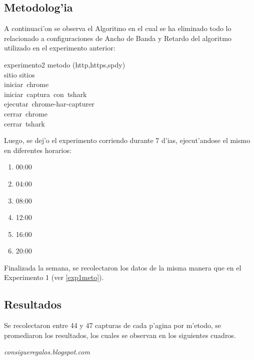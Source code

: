 \documentclass[a4paper,11pt,twocolumn]{article}
\begin{document}
\subsection{Metodolog'ia}

A continuaci'on se observa el Algoritmo en el cual se ha eliminado todo lo relacionado a configuraciones de Ancho de Banda y Retardo del algoritmo utilizado en el experimento anterior:

\begin{pseudocode}{experimento2}{ }
\FOR metodo \in (http,https,spdy) \DO \\
\BEGIN
	\FOR sitio \in sitios \DO \\
	\BEGIN
		iniciar\ chrome\\
		iniciar\ captura\ con\ tshark\\
		ejecutar\ chrome-har-capturer\\
		cerrar\ chrome\\
		cerrar\ tshark
	\END
\END
\end{pseudocode}

Luego, se dej'o el experimento corriendo durante 7 d'ias, ejecut'andose el mismo en diferentes horarios:

\begin{enumerate}
\item 00:00
\item 04:00
\item 08:00
\item 12:00
\item 16:00
\item 20:00
\end{enumerate}

Finalizada la semana, se recolectaron los datos de la misma manera que en el Experimento 1 (ver \ref{exp1meto}).

\subsection{Resultados}

Se recolectaron entre 44 y 47 capturas de cada p'agina por m'etodo, se promediaron los resultados, los cuales se observan en los siguientes cuadros. 
\vspace*{3\baselineskip}

\emph{consigueregalos.blogspot.com}
\end{document}
